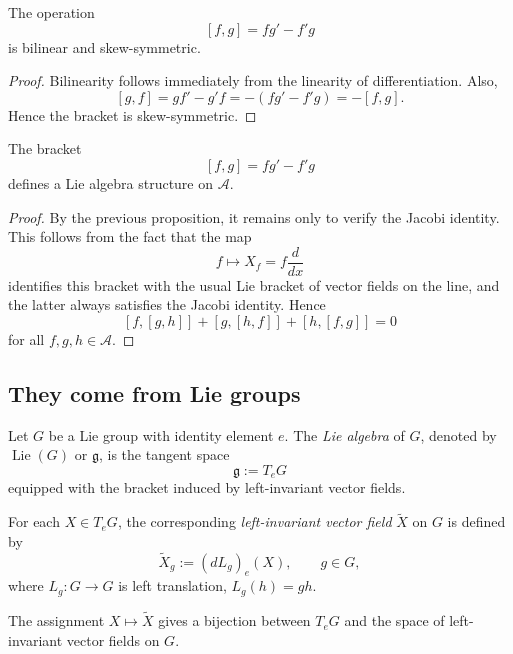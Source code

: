 \begin{proposition}
    The operation
    \[
        [f,g]=fg'-f'g
    \]
    is bilinear and skew-symmetric.
\end{proposition}

\begin{proof}
    Bilinearity follows immediately from the linearity of differentiation. Also,
    \[
        [g,f]=gf'-g'f=-(fg'-f'g)=-[f,g].
    \]
    Hence the bracket is skew-symmetric.
\end{proof}

\begin{theorem}
    The bracket
    \[
        [f,g]=fg'-f'g
    \]
    defines a Lie algebra structure on $\mathcal{A}$.
\end{theorem}

\begin{proof}
    By the previous proposition, it remains only to verify the Jacobi identity. This follows from the fact that the map
    \[
        f\longmapsto X_f=f\frac{d}{dx}
    \]
    identifies this bracket with the usual Lie bracket of vector fields on the line, and the latter always satisfies the Jacobi identity. Hence
    \[
        [f,[g,h]]+[g,[h,f]]+[h,[f,g]]=0
    \]
    for all $f,g,h\in \mathcal{A}$.
\end{proof}

\subsection{They come from Lie groups}

\begin{definition}
    Let \(G\) be a Lie group with identity element \(e\). The \emph{Lie algebra} of \(G\), denoted by \(\operatorname{Lie}(G)\) or \(\mathfrak g\), is the tangent space
    \[
        \mathfrak g:=T_eG
    \]
    equipped with the bracket induced by left-invariant vector fields.
\end{definition}

\begin{definition}
    For each \(X\in T_eG\), the corresponding \emph{left-invariant vector field} \(\widetilde X\) on \(G\) is defined by
    \[
        \widetilde X_g:=(dL_g)_e(X),
        \qquad g\in G,
    \]
    where \(L_g:G\to G\) is left translation, \(L_g(h)=gh\).
\end{definition}

\begin{proposition}
    The assignment \(X\mapsto \widetilde X\) gives a bijection between \(T_eG\) and the space of left-invariant vector fields on \(G\).
\end{proposition}

